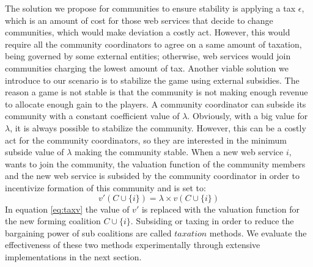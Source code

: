 \documentclass[10pt,journal,cspaper,compsoc]{IEEEtran}
\begin{document}
The solution we propose for communities to ensure  stability is
applying a tax $\epsilon$, which is an amount of cost for those
web services that decide to change communities, which would make
deviation a costly act. However, this would require all the
community coordinators to agree on a same amount of taxation,
being governed by some external entities; otherwise, web services
would join communities charging the lowest amount of tax. Another
viable solution we introduce to our scenario is to stabilize the
game using external subsidies. The reason a game is not stable is
that the community is not making enough revenue to allocate enough
gain to the players. A community coordinator can subside its community
with a constant coefficient value of $\lambda$.
%
%
Obviously, with a big value for $\lambda$, it is always possible
to stabilize the community. However, this can be a costly act for
the community coordinators, so they are interested in the minimum
subside value of $\lambda$ making the community stable. When a new web service $i$, wants to join the community, the valuation function of the community members and the new web service is subsided by the community coordinator in order to incentivize formation of this community and is set to:
\begin{equation}\label{eq:taxv}
v'(C \cup \{i\}) = \lambda \times v(C \cup \{i\})
\end{equation}
In equation \ref{eq:taxv} the value of $v'$ is replaced with the valuation function for the new forming coalition $C \cup \{i\}$.
Subsiding or taxing in order to reduce the bargaining power of sub
coalitions are called $taxation$ \cite{eps346856} methods. We
evaluate the effectiveness of these two methods experimentally
through extensive implementations in the next section.



\end{document}
